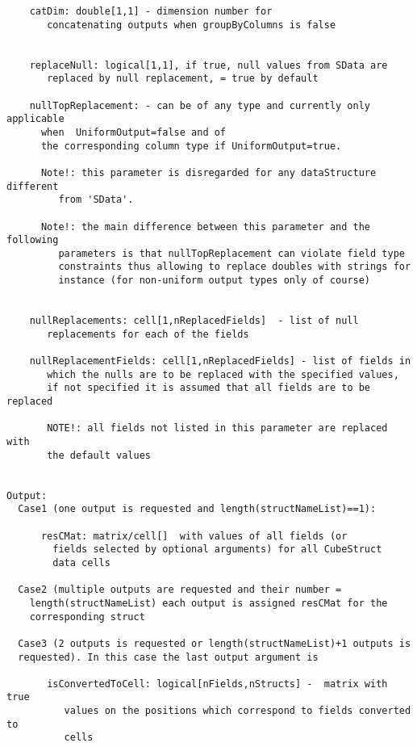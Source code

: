 \begin{verbatim}
    catDim: double[1,1] - dimension number for
       concatenating outputs when groupByColumns is false


    replaceNull: logical[1,1], if true, null values from SData are
       replaced by null replacement, = true by default

    nullTopReplacement: - can be of any type and currently only applicable
      when  UniformOutput=false and of
      the corresponding column type if UniformOutput=true.

      Note!: this parameter is disregarded for any dataStructure different
         from 'SData'.

      Note!: the main difference between this parameter and the following
         parameters is that nullTopReplacement can violate field type
         constraints thus allowing to replace doubles with strings for
         instance (for non-uniform output types only of course)


    nullReplacements: cell[1,nReplacedFields]  - list of null
       replacements for each of the fields

    nullReplacementFields: cell[1,nReplacedFields] - list of fields in
       which the nulls are to be replaced with the specified values,
       if not specified it is assumed that all fields are to be replaced

       NOTE!: all fields not listed in this parameter are replaced with
       the default values


Output:
  Case1 (one output is requested and length(structNameList)==1):

      resCMat: matrix/cell[]  with values of all fields (or
        fields selected by optional arguments) for all CubeStruct
        data cells

  Case2 (multiple outputs are requested and their number =
    length(structNameList) each output is assigned resCMat for the
    corresponding struct

  Case3 (2 outputs is requested or length(structNameList)+1 outputs is
  requested). In this case the last output argument is

       isConvertedToCell: logical[nFields,nStructs] -  matrix with true
          values on the positions which correspond to fields converted to
          cells
\end{verbatim}
